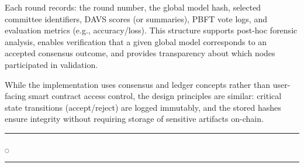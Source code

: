 Each round records: the round number, the global model hash, selected committee identifiers, DAVS scores (or summaries), PBFT vote logs, and evaluation metrics (e.g., accuracy/loss). This structure supports post-hoc forensic analysis, enables verification that a given global model corresponds to an accepted consensus outcome, and provides transparency about which nodes participated in validation.

While the implementation uses consensus and ledger concepts rather than user-facing smart contract access control, the design principles are similar: critical state transitions (accept/reject) are logged immutably, and the stored hashes ensure integrity without requiring storage of sensitive artifacts on-chain.


\rule{0.49\textwidth}{0.75pt} $_{\bigcirc}$ \rule{0.49\textwidth}{0.75pt}\\
